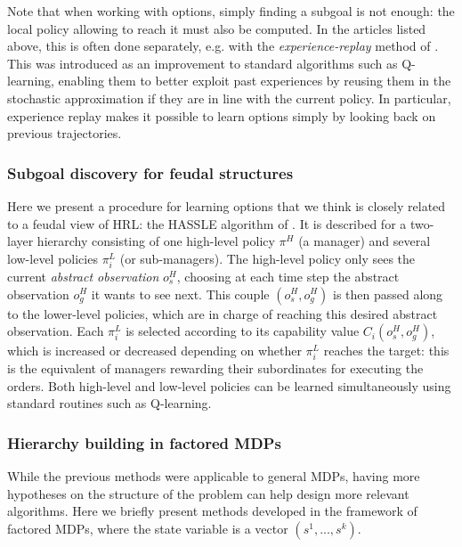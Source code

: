 \documentclass{article}
\begin{document}
Note that when working with options, simply finding a subgoal is not enough: the local policy allowing to reach it must also be computed. In the articles listed above, this is often done separately, e.g. with the \textit{experience-replay} method of \cite{lin_self-improving_1992}. This was introduced as an improvement to standard algorithms such as Q-learning, enabling them to better exploit past experiences by reusing them in the stochastic approximation if they are in line with the current policy. In particular, experience replay makes it possible to learn options simply by looking back on previous trajectories.

\subsubsection{Subgoal discovery for feudal structures}

Here we present a procedure for learning options that we think is closely related to a feudal view of HRL: the HASSLE algorithm of \cite{bakker_hierarchical_2004}. It is described for a two-layer hierarchy consisting of one high-level policy $\pi^H$ (a manager) and several low-level policies $\pi_i^L$ (or sub-managers). The high-level policy only sees the current \textit{abstract observation} $o_s^H$, choosing at each time step the abstract observation $o_g^H$ it wants to see next. This couple $(o_s^H, o_g^H)$ is then passed along to the lower-level policies, which are in charge of reaching this desired abstract observation. Each $\pi_i^L$ is selected according to its capability value $C_i(o_s^H, o_g^H)$, which is increased or decreased depending on whether $\pi_i^L$ reaches the target: this is the equivalent of managers rewarding their subordinates for executing the orders. Both high-level and low-level policies can be learned simultaneously using standard routines such as Q-learning.

\subsubsection{Hierarchy building in factored MDPs}

While the previous methods were applicable to general MDPs, having more hypotheses on the structure of the problem can help design more relevant algorithms. Here we briefly present methods developed in the framework of factored MDPs, where the state variable is a vector $(s^1, ..., s^k)$.
\end{document}
